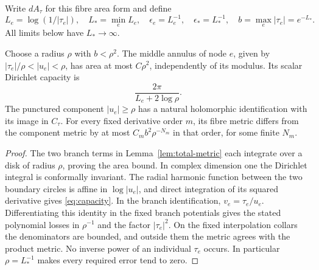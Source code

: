 Write $dA_\tau$ for this fibre area form and define
\begin{equation}\label{eq:parameters}
 L_e=\log(1/|\tau_e|),\quad L_* =\min_e L_e,\quad
 \epsilon_e=L_e^{-1},\quad \epsilon_* =L_*^{-1},\quad
 b=\max_e|\tau_e|=e^{-L_*}.
\end{equation}
All limits below have $L_*\to\infty$.

\begin{lemma}\label{lem:geometric-estimates}
Choose a radius $\rho$ with $b<\rho^2$. The middle annulus of node
$e$, given by $|\tau_e|/\rho<|u_e|<\rho$, has area at most
$C\rho^2$, independently of its modulus. Its scalar Dirichlet capacity
is
\begin{equation}\label{eq:capacity}
 \frac{2\pi}{L_e+2\log\rho}.
\end{equation}
The punctured component $|u_e|\ge\rho$ has a natural holomorphic
identification with its image in $C_\tau$. For every fixed derivative
order $m$, its fibre metric differs from the component metric by at most
$C_m b^2\rho^{-N_m}$ in that order, for some finite $N_m$.
\end{lemma}

\begin{proof}
The two branch terms in Lemma~\ref{lem:total-metric} each integrate
over a disk of radius $\rho$, proving the area bound. In complex
dimension one the Dirichlet integral is conformally invariant. The
radial harmonic function between the two boundary circles is affine in
$\log|u_e|$, and direct integration of its squared derivative gives
\eqref{eq:capacity}. In the branch identification, $v_e=\tau_e/u_e$.
Differentiating this identity in the fixed branch potentials gives the
stated polynomial losses in $\rho^{-1}$ and the factor $|\tau_e|^2$.
On the fixed interpolation collars the denominators are bounded, and
outside them the metric agrees with the product metric. No inverse power
of an individual $\tau_e$ occurs. In particular $\rho=L_*^{-1}$
makes every required error tend to zero.
\end{proof}

